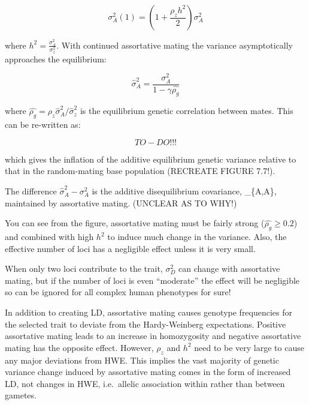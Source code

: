 \documentclass[
]{book}
\begin{document}
\begin{equation}
    \sigma^2_A(1) = (1 + \frac{\rho_z h^2} {2}) \sigma^2_A
    \label{eq:additive-genvar-onegen-AM}
\end{equation}

where \(h^2 = \frac{\sigma^2_A} {\sigma^2_z}\). With continued assortative mating the variance asymptotically approaches the equilibrium:

\begin{equation}
    \hat{\sigma}^2_A = \frac{\sigma^2_A} {1 - \gamma\hat{\rho_g}}
    \label{eq:additive-genvar-onegen-AM}
\end{equation}

where \(\hat{\rho_g} = \rho_{z}\hat{\sigma}^2_A/\hat{\sigma}^2_z\) is the equilibrium genetic correlation between mates. This can be re-written as:

\begin{equation}
    TO-DO!!!
\end{equation}

which gives the inflation of the additive equilibrium genetic variance relative to that in the random-mating base population (RECREATE FIGURE 7.7!).

The difference \(\hat{\sigma}^2_A - \sigma^2_A\) is the additive disequilibrium covariance, \sigma\_\{A,A\}, maintained by assortative mating. (UNCLEAR AS TO WHY!)

You can see from the figure, assortative mating must be fairly strong (\(\hat{\rho_g} \ge 0.2\)) and combined with high \(h^2\) to induce much change in the variance. Also, the effective number of loci has a negligible effect unless it is very small.

When only two loci contribute to the trait, \(\sigma^2_D\) can change with assortative mating, but if the number of loci is even ``moderate'' the effect will be negligible so can be ignored for all complex human phenotypes for sure!

In addition to creating LD, assortative mating causes genotype frequencies for the selected trait to deviate from the Hardy-Weinberg expectations. Positive assortative mating leads to an increase in homozygosity and negative assortative mating has the opposite effect. However, \(\rho_z\) and \(h^2\) need to be very large to cause any major deviations from HWE. This implies the vast majority of genetic variance change induced by assortative mating comes in the form of increased LD, not changes in HWE, i.e.~allelic association within rather than between gametes.
\end{document}
